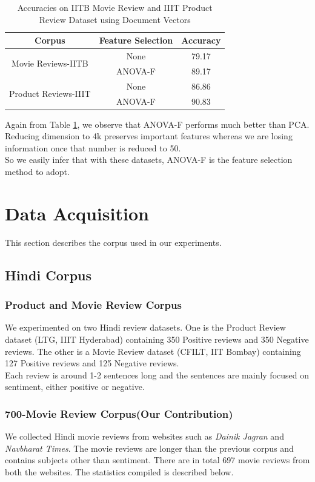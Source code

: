 \documentclass[11pt,a4paper]{article}
\begin{document}
\begin{table}[h!]
\centering
\begin{tabular}{|c|c|c|}
\hline
\textbf{Corpus} & \textbf{Feature Selection} & \textbf{Accuracy} \\ \hline
\multirow{2}{*}{Movie Reviews-IITB}   & None    & 79.17 \\ \cline{2-3} 
                                      & ANOVA-F & 89.17 \\ \hline
\multirow{2}{*}{Product Reviews-IIIT} & None    & 86.86 \\ \cline{2-3} 
                                      & ANOVA-F & 90.83 \\ \hline
\end{tabular}
\caption {Accuracies on IITB Movie Review and IIIT Product Review Dataset using Document Vectors}
\label{table:review_features}
\end{table}
Again from Table \ref{table:review_features}, we observe that ANOVA-F performs much better than PCA. Reducing dimension to 4k preserves important features whereas we are losing information once that number is reduced to 50.\\
So we easily infer that with these datasets, ANOVA-F is the feature selection method to adopt.


\section{Data Acquisition}
\label{sec:data}
This section describes the corpus used in our experiments.

\subsection{Hindi Corpus}
\label{hindi_corpus}
\subsubsection{Product and Movie Review Corpus}
We experimented on two Hindi review datasets. One is the Product Review dataset (LTG, IIIT Hyderabad) containing 350 Positive reviews and 350 Negative reviews. The other is a Movie Review dataset (CFILT, IIT Bombay) containing 127 Positive reviews and 125 Negative reviews.\\
Each review is around 1-2 sentences long and the sentences are mainly focused on sentiment, either positive or negative.

\subsubsection{700-Movie Review Corpus(Our Contribution)}
\label{new_reviews}
We collected Hindi movie reviews from websites such as \emph{Dainik Jagran} and \emph{Navbharat Times}. The movie reviews are longer than the previous corpus and contains subjects other than sentiment.
There are in total 697 movie reviews from both the websites. The statistics compiled is described below.\\
\end{document}
